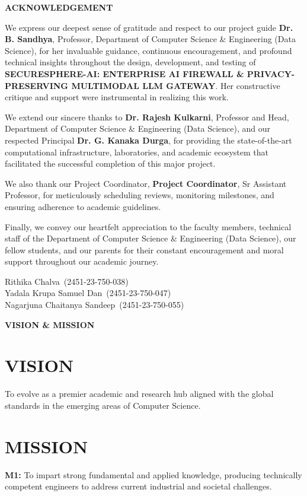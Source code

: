 \documentclass[12pt,a4paper,oneside]{report}
\newcommand{\ProjectTitle}{SECURESPHERE-AI: ENTERPRISE AI FIREWALL \& PRIVACY-PRESERVING MULTIMODAL LLM GATEWAY}
\newcommand{\Department}{Department of Computer Science \& Engineering (Data Science)}
\newcommand{\StudentOne}{Rithika Chalva}
\newcommand{\RollOne}{2451-23-750-038}
\newcommand{\StudentTwo}{Yadala Krupa Samuel Dan}
\newcommand{\RollTwo}{2451-23-750-047}
\newcommand{\StudentThree}{Nagarjuna Chaitanya Sandeep}
\newcommand{\RollThree}{2451-23-750-055}
\newcommand{\GuideName}{Dr. B. Sandhya}
\newcommand{\GuideDesignation}{Professor}
\newcommand{\HODName}{Dr. Rajesh Kulkarni}
\newcommand{\HODDesignation}{Professor and Head}
\newcommand{\PrincipalName}{Dr. G. Kanaka Durga}
\newcommand{\CoordinatorName}{Project Coordinator}
\newcommand{\CoordinatorDesignation}{Sr Assistant Professor}
\numberwithin{equation}{chapter}
\newcommand{\FrontHeading}[1]{\begin{center}\fontsize{14}{18}\selectfont\bfseries #1\end{center}\vspace{0.6cm}}
\begin{document}
\FrontHeading{ACKNOWLEDGEMENT}

We express our deepest sense of gratitude and respect to our project guide \textbf{\GuideName}, \GuideDesignation, \Department, for her invaluable guidance, continuous encouragement, and profound technical insights throughout the design, development, and testing of \textbf{\ProjectTitle}. Her constructive critique and support were instrumental in realizing this work.

We extend our sincere thanks to \textbf{\HODName}, \HODDesignation, \Department, and our respected Principal \textbf{\PrincipalName}, for providing the state-of-the-art computational infrastructure, laboratories, and academic ecosystem that facilitated the successful completion of this major project.

We also thank our Project Coordinator, \textbf{\CoordinatorName}, \CoordinatorDesignation, for meticulously scheduling reviews, monitoring milestones, and ensuring adherence to academic guidelines. 

Finally, we convey our heartfelt appreciation to the faculty members, technical staff of the Department of Computer Science \& Engineering (Data Science), our fellow students, and our parents for their constant encouragement and moral support throughout our academic journey.

\vfill
\begin{flushright}
\StudentOne\ (\RollOne)\\\StudentTwo\ (\RollTwo)\\\StudentThree\ (\RollThree)
\end{flushright}

\FrontHeading{VISION \& MISSION}
\section*{VISION}
To evolve as a premier academic and research hub aligned with the global standards in the emerging areas of Computer Science.
\section*{MISSION}
\noindent\textbf{M1:} To impart strong fundamental and applied knowledge, producing technically competent engineers to address current industrial and societal challenges.
\end{document}
